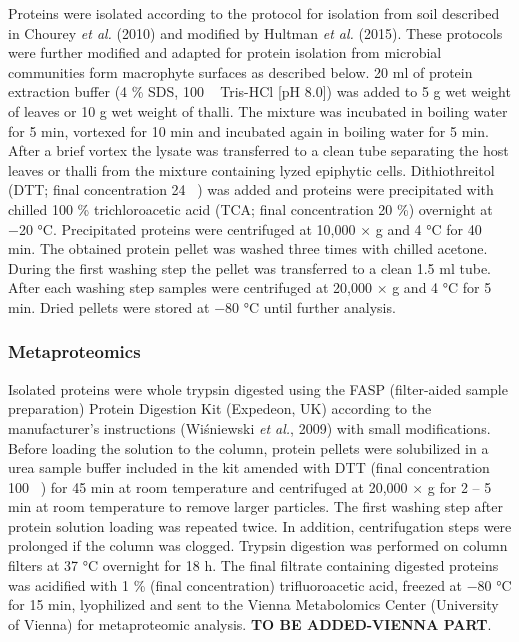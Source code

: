 \documentclass[12pt,]{article}
\begin{document}
Proteins were isolated according to the protocol for isolation from soil
described in Chourey \emph{et al.} (2010) and modified by Hultman
\emph{et al.} (2015). These protocols were further modified and adapted
for protein isolation from microbial communities form macrophyte
surfaces as described below. 20 \si{\ml} of protein extraction buffer (4
\si{\percent} SDS, 100 \si{\milli\Molar} Tris-HCl {[}pH 8.0{]}) was
added to 5 \si{\g} wet weight of leaves or 10 \si{\g} wet weight of
thalli. The mixture was incubated in boiling water for 5 \si{\minute},
vortexed for 10 \si{\minute} and incubated again in boiling water for 5
\si{\minute}. After a brief vortex the lysate was transferred to a clean
tube separating the host leaves or thalli from the mixture containing
lyzed epiphytic cells. Dithiothreitol (DTT; final concentration 24
\si{\milli\Molar}) was added and proteins were precipitated with chilled
100 \si{\percent} trichloroacetic acid (TCA; final concentration 20
\si{\percent}) overnight at \num{-20} °C. Precipitated proteins were
centrifuged at 10,000 × g and 4 \si{\degreeCelsius} for 40 \si{\minute}.
The obtained protein pellet was washed three times with chilled acetone.
During the first washing step the pellet was transferred to a clean 1.5
\si{\ml} tube. After each washing step samples were centrifuged at
20,000 × g and 4 \si{\degreeCelsius} for 5 \si{\minute}. Dried pellets
were stored at \num{-80} °C until further analysis.

\subsubsection{Metaproteomics}\label{metaproteomics}

Isolated proteins were whole trypsin digested using the FASP
(filter-aided sample preparation) Protein Digestion Kit (Expedeon, UK)
according to the manufacturer's instructions (Wiśniewski \emph{et al.},
2009) with small modifications. Before loading the solution to the
column, protein pellets were solubilized in a urea sample buffer
included in the kit amended with DTT (final concentration 100
\si{\milli\Molar}) for 45 \si{\minute} at room temperature and
centrifuged at 20,000 × g for 2 -- 5 \si{\minute} at room temperature to
remove larger particles. The first washing step after protein solution
loading was repeated twice. In addition, centrifugation steps were
prolonged if the column was clogged. Trypsin digestion was performed on
column filters at 37 \si{\degreeCelsius} overnight for 18 \si{\hour}.
The final filtrate containing digested proteins was acidified with 1
\si{\percent} (final concentration) trifluoroacetic acid, freezed at
\num{-80} \si{\degreeCelsius} for 15 \si{\minute}, lyophilized and sent
to the Vienna Metabolomics Center (University of Vienna) for
metaproteomic analysis. \textbf{TO BE ADDED-VIENNA PART}.
\end{document}
